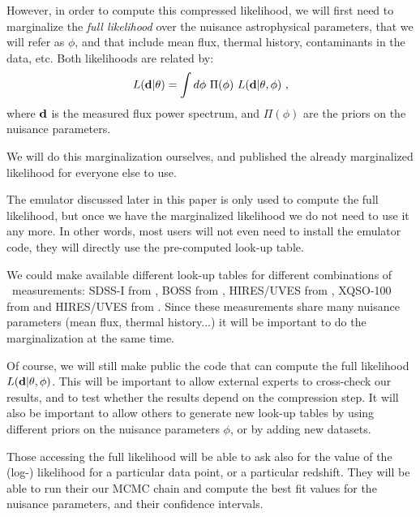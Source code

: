 However, in order to compute this compressed likelihood, we will first need
to marginalize the \textit{full likelihood} over the nuisance astrophysical
parameters, that we will refer as $\phi$, and that include mean flux,
thermal history, contaminants in the data, etc.
Both likelihoods are related by:
\begin{equation} \label{eq:marg}
 L(\mathbf{d} | \theta)
  = \int d\phi ~ \Pi(\phi) ~ L(\mathbf{d} | \theta, \phi) ~,
\end{equation}
where $\mathbf{d}$ is the measured flux power spectrum, and $\Pi(\phi)$ are the
priors on the nuisance parameters.

We will do this marginalization ourselves, and published the already
marginalized likelihood for everyone else to use.

The emulator discussed later in this paper is only used to compute the
full likelihood, but once we have the marginalized likelihood we do not
need to use it any more.
In other words, most users will not even need to install the emulator code,
they will directly use the pre-computed look-up table.

We could make available different look-up tables for different combinations
of \lya\ measurements:
SDSS-I from \cite{McDonald2006},
BOSS from \cite{Palanque-Delabrouille2013},
HIRES/UVES from \cite{Viel2013},
XQSO-100 from \cite{Irsic2017} and
HIRES/UVES from \cite{Walther2018a}.
Since these measurements share many nuisance parameters (mean flux,
thermal history...) it will be important to do the marginalization
at the same time.

Of course, we will still make public the code that can compute the full
likelihood $L(\mathbf{d} | \theta, \phi)$.
This will be important to allow external experts to cross-check our results,
and to test whether the results depend on the compression step.
It will also be important to allow others to generate new look-up tables
by using different priors on the nuisance parameters $\phi$, or by adding
new datasets.

Those accessing the full likelihood will be able to ask also for the value
of the (log-) likelihood for a particular data point, or a particular
redshift.
They will be able to run their our MCMC chain and compute the best fit 
values for the nuisance parameters, and their confidence intervals.

